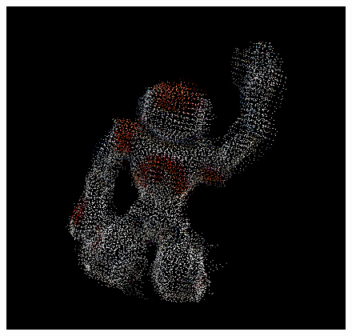 \documentclass[a4paper]{article}
\begin{document}
	\begin{figure}
		\centering
		\includegraphics[width=1\textwidth]{images/lab4_nao_registered.png}
		\caption{\label{fig:lab4_nao_registered}}
	\end{figure}
\end{document}
